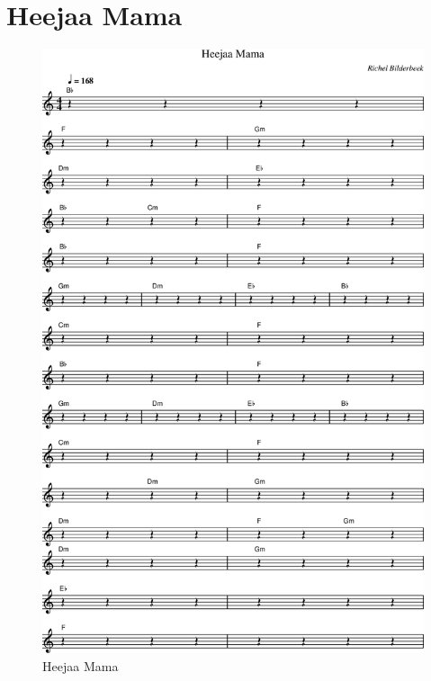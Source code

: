 \chapter{Heejaa Mama}



\begin{figure}[!htbp]
  \includegraphics[width=\textwidth,height=\textheight,keepaspectratio]{../songs/52_heejaa_mama.png}
  \caption{Heejaa Mama}
  \label{fig:52_heejaa_mama}
\end{figure}
